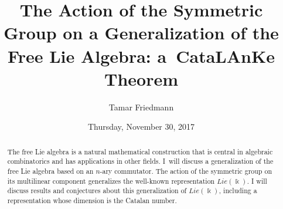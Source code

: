 \documentclass{UAmathtalk}
\author{Tamar Friedmann}
\title{The Action of the Symmetric Group on a Generalization of the Free Lie Algebra: a~CataLAnKe Theorem}
\date{Thursday, November 30, 2017}
\begin{document}
\maketitle

\begin{abstract}
The free Lie algebra is a natural mathematical construction that is central in algebraic combinatorics and has applications in other fields.  I~will discuss a generalization of the free Lie algebra based on an $n$-ary commutator. The action of the symmetric group on its multilinear component generalizes the well-known representation $Lie(\Bbbk)$. I will discuss results and conjectures about this generalization of $Lie(\Bbbk)$, including a representation whose dimension is the Catalan number.
\end{abstract}
\end{document}
